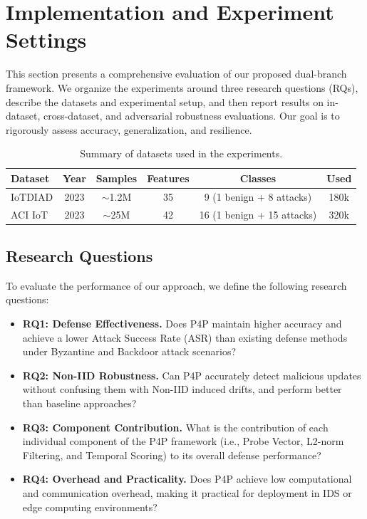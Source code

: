 \section{Implementation and Experiment Settings} \label{sec_experiment}
This section presents a comprehensive evaluation of our proposed dual-branch framework. We organize the experiments around three research questions (RQs), describe the datasets and experimental setup, and then report results on in-dataset, cross-dataset, and adversarial robustness evaluations. Our goal is to rigorously assess accuracy, generalization, and resilience. 

\begin{table}[ht]
\centering
\caption{Summary of datasets used in the experiments.}
\label{tab:dataset}
\begin{tabular}{lccccc}
\toprule
\textbf{Dataset} & \textbf{Year} & \textbf{Samples} & \textbf{Features} & \textbf{Classes} & \textbf{Used} \\
\midrule
IoTDIAD & 2023 & $\sim$1.2M & 35 & 9 (1 benign + 8 attacks) & 180k \\
ACI IoT & 2023 & $\sim$25M & 42 & 16 (1 benign + 15 attacks) & 320k \\
\bottomrule
\end{tabular}
\end{table}

\subsection{Research Questions}
To evaluate the performance of our approach, we define the following research questions:
\begin{itemize}
    \item \textbf{RQ1: Defense Effectiveness.} Does P4P maintain higher accuracy and achieve a lower Attack Success Rate (ASR) than existing defense methods under Byzantine and Backdoor attack scenarios?
    
    \item \textbf{RQ2: Non-IID Robustness.} Can P4P accurately detect malicious updates without confusing them with Non-IID induced drifts, and perform better than baseline approaches?
    
    \item \textbf{RQ3: Component Contribution.} What is the contribution of each individual component of the P4P framework (i.e., Probe Vector, L2-norm Filtering, and Temporal Scoring) to its overall defense performance?
    
    \item \textbf{RQ4: Overhead and Practicality.} Does P4P achieve low computational and communication overhead, making it practical for deployment in IDS or edge computing environments?
\end{itemize}

